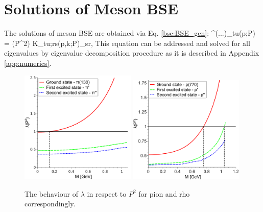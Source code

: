 \section{Solutions of Meson BSE}
The solutions of meson BSE are obtained via Eq. \ref{bse:BSE_gen}:
\beqa
	\Gamma^{(\mu...)}_{tu}(p;P) = \lambda(P^2) \int {} K_{tu;rs}(p,k;P)_{sr}\;,
	\label{spectra:BSE_gen}
\eeqa
This equation can be addressed and solved for all eigenvalues by eigenvalue decomposition procedure as it is described in Appendix \ref{app:numerics}.
\begin{figure}[H]
\begin{center}
\includegraphics[width=0.49\textwidth]{figures/lambda_pseudo} \includegraphics[width=0.49\textwidth]{figures/lambda_vector}
\caption{\footnotesize The behaviour of $\lambda$ in respect to $P^2$ for pion and rho correspondingly.}\label{fig:lambda_pseudo_vector}
\end{center}
\end{figure}
